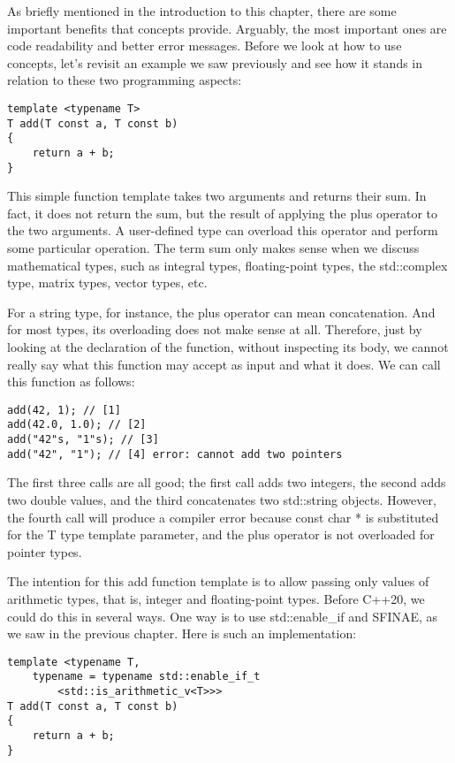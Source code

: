 As briefly mentioned in the introduction to this chapter, there are some important benefits that concepts provide. Arguably, the most important ones are code readability and better error messages. Before we look at how to use concepts, let’s revisit an example we saw previously and see how it stands in relation to these two programming aspects:

\begin{lstlisting}[style=styleCXX]
template <typename T>
T add(T const a, T const b)
{
	return a + b;
}
\end{lstlisting}

This simple function template takes two arguments and returns their sum. In fact, it does not return the sum, but the result of applying the plus operator to the two arguments. A user-defined type can overload this operator and perform some particular operation. The term sum only makes sense when we discuss mathematical types, such as integral types, floating-point types, the std::complex type, matrix types, vector types, etc.

For a string type, for instance, the plus operator can mean concatenation. And for most types, its overloading does not make sense at all. Therefore, just by looking at the declaration of the function, without inspecting its body, we cannot really say what this function may accept as input and what it does. We can call this function as follows:

\begin{lstlisting}[style=styleCXX]
add(42, 1); // [1]
add(42.0, 1.0); // [2]
add("42"s, "1"s); // [3]
add("42", "1"); // [4] error: cannot add two pointers
\end{lstlisting}

The first three calls are all good; the first call adds two integers, the second adds two double values, and the third concatenates two std::string objects. However, the fourth call will produce a compiler error because const char * is substituted for the T type template parameter, and the plus operator is not overloaded for pointer types.

The intention for this add function template is to allow passing only values of arithmetic types, that is, integer and floating-point types. Before C++20, we could do this in several ways. One way is to use std::enable\_if and SFINAE, as we saw in the previous chapter. Here is such an implementation:

\begin{lstlisting}[style=styleCXX]
template <typename T,
	typename = typename std::enable_if_t
		<std::is_arithmetic_v<T>>>
T add(T const a, T const b)
{
	return a + b;
}
\end{lstlisting}

